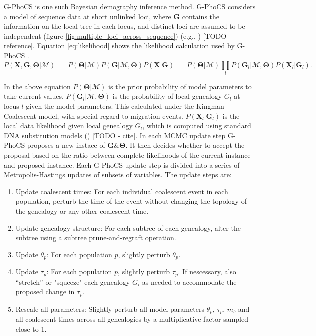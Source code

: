 \documentclass[11pt]{article}
\newcommand{\vect}[1]{\boldsymbol{\mathbf{#1}}}
\newcommand{\X}{\vect{X}}
\newcommand{\M}{\mathcal{M}}
\newcommand{\G}{\vect{G}}
\newcommand{\T}{\vect{\Theta}}
\newcommand{\1}{\mathbbm{1}}
\newcommand{\gp}{G-PhoCS }
\begin{document}
\gp is one such Bayesian demography inference method. \gp considers a model of sequence data at short unlinked loci, where $\G$ contains the information on the local tree in each locus, and distinct loci are assumed to be independent (figure \ref{fig:multiple_loci_across_sequence}) (e.g., \cite{NIELWAKE01,RANNYANG03,GRONETAL11}) [TODO - reference].
Equation \ref{eq:likelihood} shows the likelihood calculation used by \gp.
%
\begin{equation}\label{eq:likelihood}
 P(\X,\G,\T|\M) ~=~ P(\T|\M) P(\G|\M,\T) P(\X|\G) ~=~ P(\T|\M) \prod_l P(\G_l|\M,\T) P(\X_l|\G_l).
\end{equation}

In the above equation $P(\T|\M)$ is the prior probability of model parameters to take current values. $P(\G_l|\M,\T)$ is the probability of local genealogy $G_l$ at locus $l$ given the model parameters. This calculated under the Kingman Coalescent model, with special regard to migration events. $P(\X_l|\G_l)$ is the local data likelihood given local genealogy $G_l$, which is computed using standard DNA substitution models (\cite{JUKECANT69}) [TODO - cite].
%
In each MCMC update step \gp proposes a new instace of $\G \& \T$. It then decides whether to accept the proposal based on the ratio between complete likelihoods of the current instance and proposed instance.
%
Each \gp update step is divided into a series of
Metropolis-Hastings updates of subsets of variables. The update steps are:

\begin{enumerate}
\item Update coalescent times: For each individual coalescent event in each population, perturb the time of the event without changing the topology of the genealogy or any other coalescent time. 

\item Update genealogy structure: For each subtree of each genealogy, alter the subtree using a subtree prune-and-regraft operation. 

\item Update $\theta_p$: For each population $p$, slightly perturb $\theta_p$.

\item Update $\tau_p$: For each population $p$, slightly perturb $\tau_p$. If nescessary, also “stretch” or "squeeze" each genealogy $G_i$ as needed to accommodate the proposed change in $\tau_p$. 
%

\item Rescale all parameters: Slightly perturb all model parameters ${\theta_p}$, ${\tau_p}$, ${m_b}$ and all coalescent
times across all genealogies by a multiplicative factor sampled close to 1.

\end{enumerate}
\end{document}
